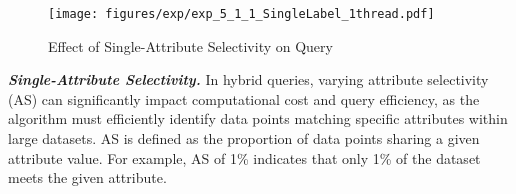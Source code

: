 \documentclass[sigconf, nonacm]{acmart}
\begin{document}
%	
	
	\begin{figure}
		\centering
		\setlength{\abovecaptionskip}{0.1cm}
		\setlength{\belowcaptionskip}{-0.1cm}
		\texttt{[image: figures/exp/exp\_5\_1\_1\_SingleLabel\_1thread.pdf]}
		\caption{Effect of Single-Attribute Selectivity on Query}
		\label{fig:exp_5_1_1_SingleLabel_1thread}
	\end{figure}
	
	
	\textit{\textbf{Single-Attribute Selectivity.}}
	In hybrid queries, varying attribute selectivity (AS) can significantly impact computational cost and query efficiency, as the algorithm must efficiently identify data points matching specific attributes within large datasets. AS is defined as the proportion of data points sharing a given attribute value. For example, AS of 1\% indicates that only 1\% of the dataset meets the given attribute. 
	
\end{document}

